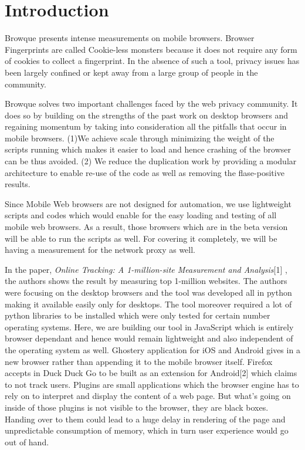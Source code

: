 \documentclass[journal]{IEEEtran}
\begin{document}
\section{Introduction}
Browque presents intense measurements on mobile browsers. Browser Fingerprints are called
Cookie-less monsters because it does not require
any form of cookies to collect a fingerprint. In the absence of such a tool, privacy issues
has been largely confined or kept away from a large group of people in the
community. 


Browque solves two important challenges faced by the web privacy community. It
does so by building on the strengths of the past work on desktop browsers and
regaining momentum by taking into consideration all the pitfalls that occur in
mobile browsers. (1)We achieve scale through minimizing the weight of the
scripts running which makes it easier to load and hence crashing of the browser
can be thus avoided. (2) We reduce the duplication work by providing a modular
architecture to enable re-use of the code as well as removing the flase-positive results.

Since Mobile Web browsers are not designed for automation, we use lightweight scripts
and codes which would enable for the easy loading and testing of all mobile web
browsers. As a result, those browsers which are in the beta version will be able
to run the scripts as well. For covering it completely, we will be having a
measurement for the network proxy as well.


In the paper, \textit{Online Tracking: A 1-million-site Measurement and Analysis}[1] , the
authors shows the result by measuring top 1-million websites. The authors were
focusing on the desktop browsers and the tool was developed all in python making it
available easily only for desktops. The tool moreover required a lot of python libraries to be
installed which were only tested for certain number operating systems. Here, we
are building our tool in JavaScript which is entirely browser dependant and
hence would remain lightweight and also independent of the operating system as
well. Ghostery application for iOS and Android gives in a new browser rather
than appending it to the mobile browser itself.  Firefox accepts in Duck Duck Go
to be built as an extension for Android[2] which claims to not track users. Plugins
are small applications which the browser engine has to rely on to interpret and
display the content of a web page. But what's going on inside of those plugins
is not visible to the browser, they are black boxes. Handing over to them could
lead to a huge delay in rendering of the page and unpredictable consumption of
memory, which in turn user experience would go out of hand. 
\end{document}
